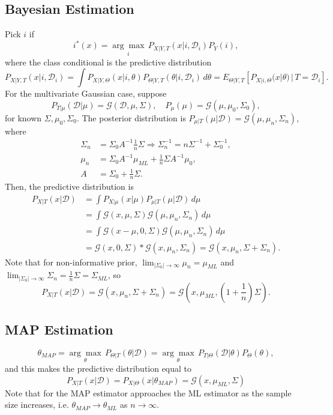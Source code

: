 \documentclass{article}
\newenvironment{topic}[1]{\subsection*{#1}}{}
\newcommand*{\G}{\mathcal{G}}
\newcommand*{\D}{\mathcal{D}}
\begin{document}
\begin{topic}{Bayesian Estimation}
    Pick $i$ if
    \[
        i^{*}(x) = \underset{i}{\arg \max} \, P_{X|Y, T}(x|i, \D_i)P_Y(i),
    \]
    where the class conditional is the predictive distribution
    \[
        P_{X|Y, T}(x|i, \D_i) = \int P_{X|Y, \Theta}(x|i, \theta)P_{\Theta|Y, T}(\theta|i, \D_i) \, d\theta = E_{\Theta|Y, T}[P_{X|i, \Theta}(x|\theta) \, | \, T = \D_i].
    \]
    For the multivariate Gaussian case, suppose
    \[
        P_{T|\mu}(\D|\mu) = \G(\D, \mu, \Sigma), \quad P_{\mu}(\mu) = \G(\mu, \mu_0, \Sigma_0),
    \]
    for known $\Sigma, \mu_0, \Sigma_0$. The posterior distribution is $P_{\mu|T}(\mu|\D) = \G(\mu, \mu_n, \Sigma_n)$, where 
    \begin{align*}
        \Sigma_n &= \Sigma_0A^{-1}\frac{1}{n}\Sigma \Rightarrow \Sigma_n^{-1} = n\Sigma^{-1} + \Sigma_0^{-1}, \\
        \mu_n &= \Sigma_0A^{-1}\mu_{ML} + \frac{1}{n}\Sigma A^{-1}\mu_0, \\
        A &= \Sigma_0 + \frac{1}{n}\Sigma.
    \end{align*}
    Then, the predictive distribution is
    \begin{align*}
        P_{X|T}(x|\D)
        &= \int P_{X|\mu}(x|\mu)P_{\mu|T}(\mu|\D) \, d\mu \\
        &= \int \G(x, \mu, \Sigma)\G(\mu, \mu_n, \Sigma_n) \, d\mu \\
        &= \int \G(x - \mu, 0, \Sigma)\G(\mu, \mu_n, \Sigma_n) \, d\mu \\
        &= \G(x, 0, \Sigma) * \G(x, \mu_n, \Sigma_n) = \G(x, \mu_n, \Sigma + \Sigma_n).
    \end{align*}
    Note that for non-informative prior, $\displaystyle{\lim_{|\Sigma_0| \to \infty}} \mu_n = \mu_{ML}$ and $\displaystyle{\lim_{|\Sigma_0| \to \infty}} \Sigma_n = \frac{1}{n}\Sigma = \Sigma_{ML}$, so
    \[
        P_{X|T}(x|\D) = \G(x, \mu_n, \Sigma + \Sigma_n) = \G\left(x, \mu_{ML}, \left(1 + \frac{1}{n}\right)\Sigma\right).
    \]
\end{topic}

\begin{topic}{MAP Estimation}
    \[
        \theta_{MAP} = \underset{\theta}{\arg \max} \, P_{\Theta|T}(\theta|\D) = \underset{\theta}{\arg \max} \, P_{T|\Theta}(\D|\theta)P_{\Theta}(\theta),
    \]
    and this makes the predictive distribution equal to
    \[
        P_{X|T}(x|\D) = P_{X|\Theta}(x|\theta_{MAP}) = \G(x, \mu_{ML}, \Sigma)
    \]
    Note that for the MAP estimator approaches the ML estimator as the sample size increases, i.e. $\theta_{MAP} \rightarrow \theta_{ML}$ as $n \rightarrow \infty$.
\end{topic}
\end{document}
